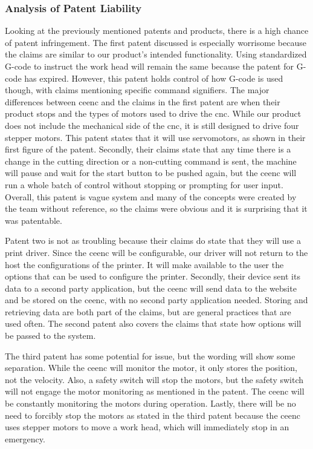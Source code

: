 \subsubsection{Analysis of Patent Liability}
Looking at the previously mentioned patents and products, there is a high chance of patent infringement.
The first patent discussed is especially worrisome because the claims are similar to our product's intended functionality.
Using standardized G-code to instruct the work head will remain the same because the patent for G-code has expired.
However, this patent holds control of how G-code is used though, with claims mentioning specific command signifiers.
The major differences between \gls{ceenc} and the claims in the first patent are when their product stops and the types of motors used to drive the \gls{cnc}.
While our product does not include the mechanical side of the \gls{cnc}, it is still designed to drive four stepper motors. 
This patent states that it will use servomotors, as shown in their first figure of the patent. 
Secondly, their claims state that any time there is a change in the cutting direction or a non-cutting command is sent, the machine will pause and wait for the start button to be pushed again, but the \gls{ceenc} will run a whole batch of control without stopping or prompting for user input.
Overall, this patent is vague system and many of the concepts were created by the team without reference, so the claims were obvious and it is surprising that it was patentable.

Patent two is not as troubling because their claims do state that they will use a print driver. 
Since the \gls{ceenc} will be configurable, our driver will not return to the host the configurations of the printer.
It will make available to the user the options that can be used to configure the printer.
Secondly, their device sent its data to a second party application, but the \gls{ceenc} will send data to the website and be stored on the \gls{ceenc}, with no second party application needed.
Storing and retrieving data are both part of the claims, but are general practices that are used often.
The second patent also covers the claims that state how options will be passed to the system.

The third patent has some potential for issue, but the wording will show some separation. 
While the \gls{ceenc} will monitor the motor, it only stores the position, not the velocity.
Also, a safety switch will stop the motors, but the safety switch will not engage the motor monitoring as mentioned in the patent. 
The \gls{ceenc} will be constantly monitoring the motors during operation.
Lastly, there will be no need to forcibly stop the motors as stated in the third patent because the \gls{ceenc} uses stepper motors to move a work head, which will immediately stop in an emergency.

